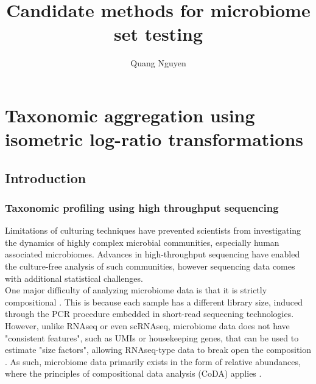 \documentclass{article}
\title{Candidate methods for microbiome set testing}
\author{Quang Nguyen}
\begin{document}
\maketitle

\section{Taxonomic aggregation using isometric log-ratio transformations}
\subsection{Introduction}
\subsubsection{Taxonomic profiling using high throughput sequencing}
 Limitations of culturing techniques have prevented scientists from investigating the dynamics of highly complex microbial communities, especially human associated microbiomes. Advances in high-throughput sequencing have enabled the culture-free analysis of such communities, however sequencing data comes with additional statistical challenges. \\
 One major difficulty of analyzing microbiome data is that it is strictly compositional \cite{gloor2017}. This is because each sample has a different library size, induced through the PCR procedure embedded in short-read sequecning technologies. However, unlike RNAseq or even scRNAseq, microbiome data does not have "consistent features", such as UMIs or housekeeping genes, that can be used to estimate "size factors", allowing RNAseq-type data to break open the composition \cite{quinn2018}. As such, microbiome data primarily exists in the form of relative abundances, where the principles of compositional data analysis (CoDA) applies \cite{aitchison}. 
\end{document}

